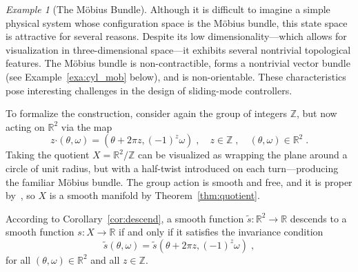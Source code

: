 \documentclass{article}
\theoremstyle{definition}
\theoremstyle{remark}
\newtheorem{example}{Example}
\newcommand{\bscdot}{\boldsymbol{\cdot}}
\newcommand{\IN}{\mathbb{Z}}	%
\newcommand{\MA}{X}	%
\newcommand{\RR}{\mathbb{R}}	%
\begin{document}
\begin{example}[The M\"obius Bundle] \label{exa:MobiusI}
 Although it is difficult to imagine a simple physical system whose configuration space is the M\"obius bundle, this state space
 is attractive for several reasons. Despite its low dimensionality---which allows for visualization in three-dimensional
 space---it exhibits several nontrivial topological features. The M\"obius bundle is non-contractible,
 forms a nontrivial vector bundle (see Example~\ref{exa:cyl_mob} below), and is non-orientable. These characteristics pose 
 interesting challenges in the design of sliding-mode controllers. 
 
 To formalize the construction, consider again the group of integers $\IN$, but now acting on $\RR^2$ via the map
 \begin{equation} \label{eq:action_mobius} 
   z\bscdot(\theta,\omega) = (\theta + 2\pi z, (-1)^z \omega) \;, \quad z \in \IN \;, \quad (\theta, \omega) \in \RR^2 \;.
 \end{equation} Taking the quotient $\MA = \RR^2 / \IN$ can be visualized as wrapping the plane around a circle
 of unit radius, but with a half-twist introduced on each turn—producing the familiar M\"obius bundle. The group
 action is smooth and free, and it is proper by~\cite[Prop. 9.12]{lee}, so $\MA$ is a smooth manifold by
 Theorem~\ref{thm:quotient}.
 
 According to Corollary~\ref{cor:descend}, a smooth function $\tilde{s} : \RR^2 \to \RR$ descends to a smooth
 function $s : \MA \to \RR$ if and only if it satisfies the invariance condition
 \begin{equation} \label{eq:mobius_c}
  \tilde{s}(\theta, \omega) = \tilde{s}(\theta + 2\pi z, (-1)^z \omega) \;, 
 \end{equation} for all $(\theta, \omega) \in \RR^2$ and all $z \in \IN$.


\end{example}
\end{document}
